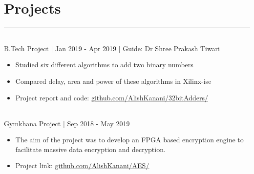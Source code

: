 \documentclass[]{resume}
\begin{document}
\begin{minipage}[t]{0.66\textwidth}
\vspace{-1.5em}
\section{Projects}
\vspace{-0.5em}
\noindent\rule{12.5cm}{0.4pt}

\vspace{0.5em}
\hspace{1em}
\\
\hspace*{1em} B.Tech Project | Jan 2019 - Apr 2019 | Guide: Dr Shree Prakash Tiwari  \\ 
\vspace{-2.3em}
\descript{}
\begin{itemize}
    \item Studied six different algorithms to add two binary numbers 
    \vspace{-0.6em}\\
    \item Compared delay, area and power of these algorithms in Xilinx-ise
    \vspace{-0.6em}\\
    \item Project report and code:  {\href{https://github.com/AlishKanani/32bitAdders}{\underline{github.com/AlishKanani/32bitAdders/}}} \\
\end{itemize}
\sectionsep

\vspace{-1em}
\hspace{1em}
\\
\hspace*{1em} Gymkhana Project | Sep 2018 - May 2019   \\ 
\vspace{-2.3em}
\descript{}
\begin{itemize}
    \item The aim of the project was to develop an FPGA based encryption engine to facilitate massive data encryption and decryption.
    \vspace{-0.6em}\\
    \item Project link: {\href{https://github.com/AlishKanani/AES}{\underline{github.com/AlishKanani/AES/}}}
\end{itemize}
\sectionsep


\end{minipage}
\end{document}
